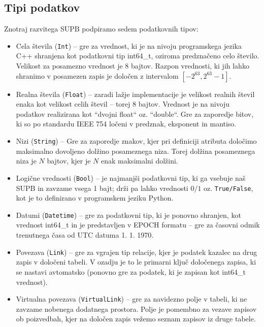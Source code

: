 \documentclass[a4paper,12pt,openright]{book}
\begin{document}
        \subsection{Tipi podatkov}
        Znotraj razvitega SUPB podpiramo sedem podatkovnih tipov:
        \begin{itemize}
            \item Cela števila ({\tt Int}) – gre za vrednost, ki je na nivoju programskega jezika C++ shranjena kot podatkovni tip int64\_t, oziroma predznačeno celo število. Velikost za posamezno vrednost je 8 bajtov. Razpon vrednosti, ki jih lahko shranimo v posamezen zapis je določen z intervalom $[-2^{63}, 2^{63} - 1]$.
            \item Realna števila ({\tt Float}) – zaradi lažje implementacije je velikost realnih števil enaka kot velikost celih števil – torej 8 bajtov. Vrednost je na nivoju podatkov realizirana kot ``dvojni float`` oz. ``double``. Gre za zaporedje bitov, ki so po standardu IEEE 754 \cite{kahan1996ieee} ločeni v predznak, eksponent in mantiso.
            \item Nizi ({\tt String}) – Gre za zaporedje znakov, kjer pri definiciji atributa določimo maksimalno dovoljeno dolžino posameznega niza. Torej dolži\-na posameznega niza je $N$ bajtov, kjer je $N$ enak maksimalni dolžini.
            \item Logične vrednosti ({\tt Bool}) – je najmanjši podatkovni tip, ki ga vsebuje naš SUPB in zavzame vsega 1 bajt; drži pa lahko vrednosti $0/1$ oz. {\tt True/False}, kot je to definirano v programskem jeziku Python.
            \item Datumi ({\tt Datetime}) – gre za podatkovni tip, ki je ponovno shranjen, kot vrednost int64\_t in je predstavljen v EPOCH formatu \cite{EPOCH_FORMAT} – gre za časovni odmik trenutnega časa od UTC datuma 1. 1. 1970. 
            \item Povezava ({\tt Link}) – gre za vgrajen tip relacije, kjer je podatek kazalec na drug zapis v določeni tabeli. V ozadju je to le primarni ključ določenega zapisa, ki se nastavi avtomatsko (ponovno gre za podatek, ki je zapisan kot int64\_t vrednost).
            \item Virtualna povezava ({\tt VirtualLink}) – gre za navidezno polje v tabeli, ki ne zavzame nobenega dodatnega prostora. Polje je pomembno za vezave zapisov ob poizvedbah, kjer na določen zapis vežemo seznam zapisov iz druge tabele.  
        \end{itemize}
        
\end{document}
